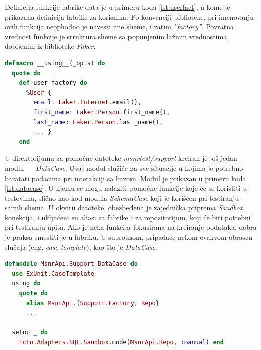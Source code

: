 \documentclass[12pt,oneside]{memoir}
\begin{document}
\par Definicija funkcije fabrike data je u primeru koda \ref{lst:userfact}, u kome je prikazana definicija fabrike za korisnika. Po konvenciji biblioteke, pri imenovanju ovih funkcija neophodno je navesti ime sheme, i zatim \emph{''{\textunderscore}factory''}. Povratna vrednost funkcije je struktura sheme sa popunjenim lažnim vrednostima, dobijenim iz biblioteke \emph{Faker}. \\

\begin{minipage}{\linewidth}
\begin{lstlisting}[language=elixir, basicstyle=\small, caption={Definicija modula \emph{UserFactory}},captionpos=b, label={lst:userfact}]
defmacro __using__(_opts) do
  quote do
    def user_factory do
      %User {
        email: Faker.Internet.email(),
        first_name: Faker.Person.first_name(),
        last_name: Faker.Person.last_name(),
        ... }
    end
\end{lstlisting}
\end{minipage}

\par U direktorijumu za pomoćne datoteke \emph{msnr{\textunderscore}test/support} kreiran je još jedan modul --- \emph{DataCase}. Ovaj modul služiće za sve situacije u kojima je potrebno baratati podacima pri interakciji sa bazom. Modul je prikazan u primeru koda \ref{lst:datacase}. U njemu se mogu nalaziti pomoćne funkcije koje će se koristiti u testovima, slično kao kod modula \emph{SchemaCase} koji je korišćen pri testiranju samih shema. U okviru datoteke, obezbeđena je zajednička priprema \emph{Sandbox} konekcija, i uključeni su aliasi za fabrike i za repozitorijum, koji će biti potrebni pri testiranju upita. Ako je neka funkcija fokusirana na kreiranje podataka, dobra je praksa smestiti je u fabriku. U suprotnom, pripadaće nekom ovakvom obrascu slučaja (eng. \emph{case template}), kao što je \emph{DataCase}. \\ 

\begin{minipage}{\linewidth}
\begin{lstlisting}[language=elixir, basicstyle=\small, caption={Definicija modula \emph{DataCase}},captionpos=b, label={lst:datacase}]
defmodule MsnrApi.Support.DataCase do
  use ExUnit.CaseTemplate
  using do
    quote do
      alias MsnrApi.{Support.Factory, Repo}
      ...
      
  setup _ do
    Ecto.Adapters.SQL.Sandbox.mode(MsnrApi.Repo, :manual) end
\end{lstlisting}
\end{minipage}
\end{document}
